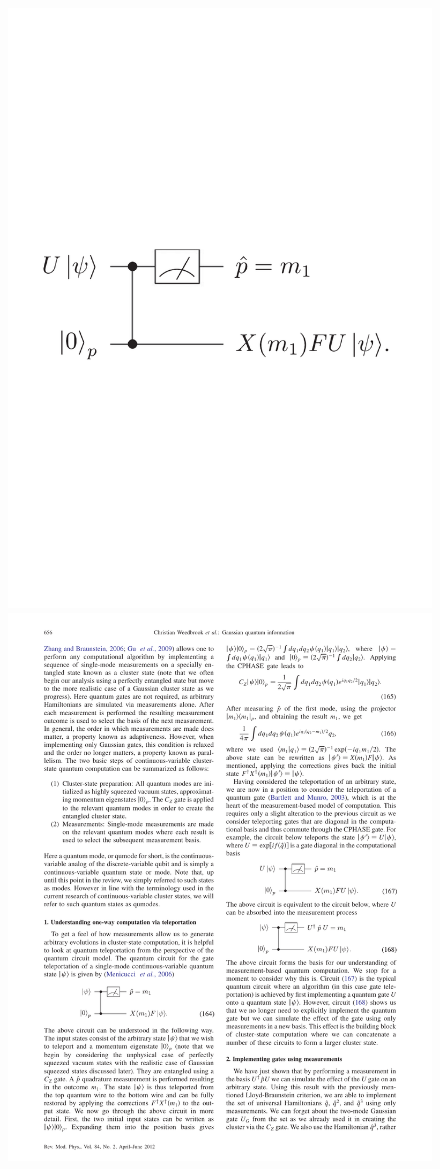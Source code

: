 \documentclass[pra,
superscriptaddress,
 amsmath,amssymb,
 aps,twocolumn]{revtex4-1}
\begin{document}
\begin{figure}[thb]
\includegraphics[trim = 0cm 10cm 0cm 10cm, clip, width=0.8\linewidth]{teleport_circ2.pdf}
\\
\includegraphics[trim = 0cm 0cm 0cm 0cm, clip, width=0.8\linewidth]{teleport_circ3.pdf}
\caption{\label{fig:cluster_Teleport23}}
\end{figure}
\end{document}
